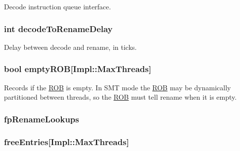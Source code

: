 \label{classDefaultRename_a7860fc5736574343c9e294cb2bef9d93}
Decode instruction queue interface. \hypertarget{classDefaultRename_a4ff2f51d1e391f739d6d1c73a6bcd0c1}{
\subsubsection[{decodeToRenameDelay}]{\setlength{\rightskip}{0pt plus 5cm}int {\bf decodeToRenameDelay}}}
\label{classDefaultRename_a4ff2f51d1e391f739d6d1c73a6bcd0c1}
Delay between decode and rename, in ticks. \hypertarget{classDefaultRename_a5a3345554ca63a6e859943d7174d714f}{
\subsubsection[{emptyROB}]{\setlength{\rightskip}{0pt plus 5cm}bool {\bf emptyROB}\mbox{[}Impl::MaxThreads\mbox{]}}}
\label{classDefaultRename_a5a3345554ca63a6e859943d7174d714f}
Records if the \hyperlink{classROB}{ROB} is empty. In SMT mode the \hyperlink{classROB}{ROB} may be dynamically partitioned between threads, so the \hyperlink{classROB}{ROB} must tell rename when it is empty. \hypertarget{classDefaultRename_ad27b51042b9dc458c5dd63b8c5f8d467}{
\subsubsection[{fpRenameLookups}]{ {\bf fpRenameLookups}}}
\label{classDefaultRename_ad27b51042b9dc458c5dd63b8c5f8d467}
\hypertarget{classDefaultRename_a20d0243bc02977001bfbd4834a7d8b5d}{
\subsubsection[{freeEntries}]{ {\bf freeEntries}\mbox{[}Impl::MaxThreads\mbox{]}}}
